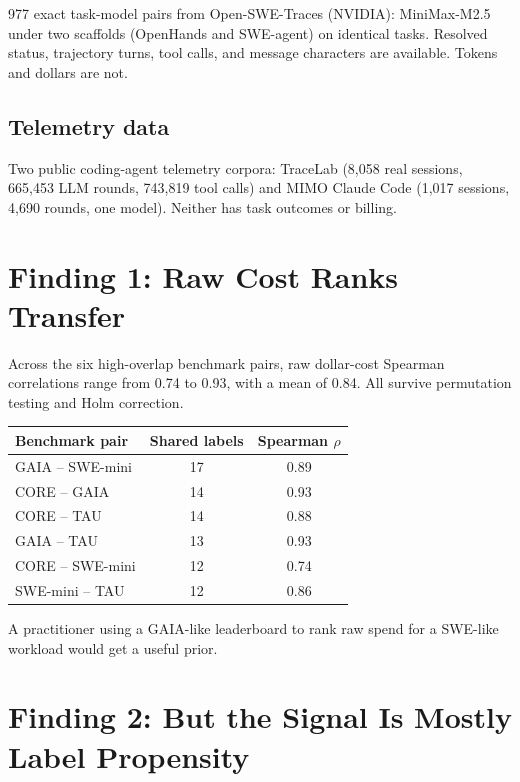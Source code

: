 \documentclass[11pt]{article}
\begin{document}
977 exact task-model pairs from Open-SWE-Traces (NVIDIA): MiniMax-M2.5 under
two scaffolds (OpenHands and SWE-agent) on identical tasks. Resolved status,
trajectory turns, tool calls, and message characters are available. Tokens and
dollars are not.

\subsection{Telemetry data}

Two public coding-agent telemetry corpora: TraceLab (8{,}058 real sessions,
665{,}453 LLM rounds, 743{,}819 tool calls) and MIMO Claude Code (1{,}017
sessions, 4{,}690 rounds, one model). Neither has task outcomes or billing.

\section{Finding 1: Raw Cost Ranks Transfer}

Across the six high-overlap benchmark pairs, raw dollar-cost Spearman
correlations range from 0.74 to 0.93, with a mean of 0.84. All survive
permutation testing and Holm correction.

\begin{center}
\begin{tabular}{lcc}
\toprule
Benchmark pair & Shared labels & Spearman $\rho$ \\
\midrule
GAIA -- SWE-mini & 17 & 0.89 \\
CORE -- GAIA & 14 & 0.93 \\
CORE -- TAU & 14 & 0.88 \\
GAIA -- TAU & 13 & 0.93 \\
CORE -- SWE-mini & 12 & 0.74 \\
SWE-mini -- TAU & 12 & 0.86 \\
\bottomrule
\end{tabular}
\end{center}

A practitioner using a GAIA-like leaderboard to rank raw spend for a SWE-like
workload would get a useful prior.

\section{Finding 2: But the Signal Is Mostly Label Propensity}
\end{document}
